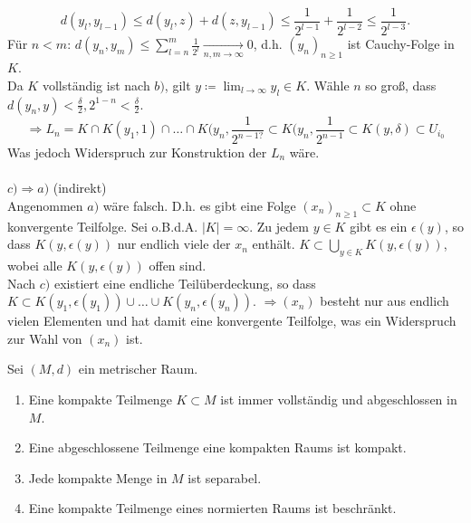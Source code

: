 \begin{beweis}
	\[ d(y_{l}, y_{l - 1}) \leq d(y_{l}, z) + d(z, y_{l - 1}) \leq \frac{1}{2^{l - 1}} + \frac{1}{2^{l - 2}} \leq \frac{1}{2^{l - 3}}. \]
	Für $n < m$: $d(y_{n}, y_{m}) \leq \sum_{l = n}^{m} \frac{1}{2^{l}} \xrightarrow[n, m \rightarrow \infty]{} 0$, d.h. $(y_{n})_{n \geq 1}$ ist Cauchy-Folge in $K$. \\
	Da $K$ vollständig ist nach $b)$, gilt $y \coloneqq \lim_{l \rightarrow \infty} y_{l} \in K$.
	Wähle $n$ so gro{\ss}, dass $d(y_{n}, y) < \frac{\delta}{2}, 2^{1-n} < \frac{\delta}{2}$. \\
	\[ \Rightarrow L_{n} = K \cap K(y_{1}, 1) \cap \dotsc \cap K(y_{n}, \frac{1}{2^{n - 1 ?}} \subset K(y_{n}, 	\frac{1}{2^{n - 1}} \subset K(y, \delta) \subset U_{i_{0}} \]
	Was jedoch Widerspruch zur Konstruktion der $L_{n}$ wäre. \\ \\
	$c) \Rightarrow a)$ (indirekt) \\
	Angenommen $a)$ wäre falsch. D.h. es gibt eine Folge $(x_{n})_{n \geq 1} \subset K$ ohne konvergente Teilfolge. Sei o.B.d.A. $|K| = \infty$. Zu jedem $y \in K$ gibt es ein $	\epsilon(y)$, so dass $K(y, \epsilon(y))$ nur endlich viele der $x_{n}$ enthält. $K \subset \bigcup_{y \in K} K(y, \epsilon(y))$, wobei alle $K(y, \epsilon(y))$ offen sind. \\
	Nach $c)$ existiert eine endliche Teilüberdeckung, so dass $K \subset K(y_{1}, \epsilon(y_{1})) \cup \dotsc \cup K(y_{n}, \epsilon(y_{n}))$.
	$\Rightarrow (x_{n})$ besteht nur aus endlich vielen Elementen und hat damit eine konvergente Teilfolge, was ein Widerspruch zur Wahl von $(x_{n})$ ist.
\end{beweis}

\begin{prop} \label{prop:6.6}
	Sei $(M, d)$ ein metrischer Raum.
	\begin{enumerate}[label=\alph*\upshape)]
		\item Eine kompakte Teilmenge $K \subset M$ ist immer vollständig und abgeschlossen in $M$.
		\item Eine abgeschlossene Teilmenge eine kompakten Raums ist kompakt.
		\item Jede kompakte Menge in $M$ ist separabel.
		\item Eine kompakte Teilmenge eines normierten Raums ist beschränkt.
	\end{enumerate}
\end{prop}

